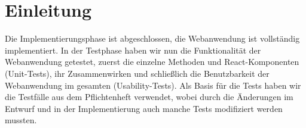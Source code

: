 \section{Einleitung}

Die Implementierungsphase ist abgeschlossen, die Webanwendung ist vollständig implementiert. In der Testphase haben wir nun die Funktionalität der Webanwendung getestet, zuerst die einzelne Methoden und React-Komponenten (Unit-Tests), ihr Zusammenwirken und schließlich die Benutzbarkeit der Webanwendung im gesamten (Usability-Tests).
Als Basis für die Tests haben wir die Testfälle aus dem Pflichtenheft verwendet, wobei durch die Änderungen im Entwurf und in der Implementierung auch manche Tests modifiziert werden mussten.

